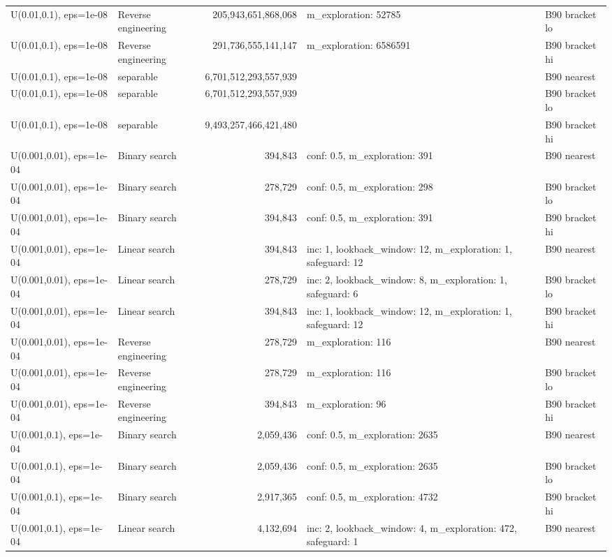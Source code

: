 \begin{tabular}{llrll}
U(0.01,0.1), eps=1e-08 & Reverse engineering & 205,943,651,868,068 & m\_exploration: 52785 & B90 bracket lo \\
U(0.01,0.1), eps=1e-08 & Reverse engineering & 291,736,555,141,147 & m\_exploration: 6586591 & B90 bracket hi \\
U(0.01,0.1), eps=1e-08 & separable & 6,701,512,293,557,939 &  & B90 nearest \\
U(0.01,0.1), eps=1e-08 & separable & 6,701,512,293,557,939 &  & B90 bracket lo \\
U(0.01,0.1), eps=1e-08 & separable & 9,493,257,466,421,480 &  & B90 bracket hi \\
U(0.001,0.01), eps=1e-04 & Binary search & 394,843 & conf: 0.5, m\_exploration: 391 & B90 nearest \\
U(0.001,0.01), eps=1e-04 & Binary search & 278,729 & conf: 0.5, m\_exploration: 298 & B90 bracket lo \\
U(0.001,0.01), eps=1e-04 & Binary search & 394,843 & conf: 0.5, m\_exploration: 391 & B90 bracket hi \\
U(0.001,0.01), eps=1e-04 & Linear search & 394,843 & inc: 1, lookback\_window: 12, m\_exploration: 1, safeguard: 12 & B90 nearest \\
U(0.001,0.01), eps=1e-04 & Linear search & 278,729 & inc: 2, lookback\_window: 8, m\_exploration: 1, safeguard: 6 & B90 bracket lo \\
U(0.001,0.01), eps=1e-04 & Linear search & 394,843 & inc: 1, lookback\_window: 12, m\_exploration: 1, safeguard: 12 & B90 bracket hi \\
U(0.001,0.01), eps=1e-04 & Reverse engineering & 278,729 & m\_exploration: 116 & B90 nearest \\
U(0.001,0.01), eps=1e-04 & Reverse engineering & 278,729 & m\_exploration: 116 & B90 bracket lo \\
U(0.001,0.01), eps=1e-04 & Reverse engineering & 394,843 & m\_exploration: 96 & B90 bracket hi \\
U(0.001,0.1), eps=1e-04 & Binary search & 2,059,436 & conf: 0.5, m\_exploration: 2635 & B90 nearest \\
U(0.001,0.1), eps=1e-04 & Binary search & 2,059,436 & conf: 0.5, m\_exploration: 2635 & B90 bracket lo \\
U(0.001,0.1), eps=1e-04 & Binary search & 2,917,365 & conf: 0.5, m\_exploration: 4732 & B90 bracket hi \\
U(0.001,0.1), eps=1e-04 & Linear search & 4,132,694 & inc: 2, lookback\_window: 4, m\_exploration: 472, safeguard: 1 & B90 nearest \\

\end{tabular}
